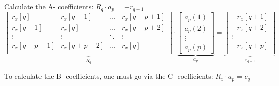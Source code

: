 \begin{aufzaehlung}
			\item Calculate the A- coefficients: $R_q \cdot a_p = - r_{q+1}$
			\small$$
\underbrace{\begin{bmatrix}
			r_x[q] & r_x[q-1] & \hdots & r_x[q-p+1] \\
			r_x[q+1] & r_x[q] & \hdots & r_x[q-p+2] \\
			\vdots & \vdots & \ddots & \vdots \\
			r_x[q+p-1] & r_x[q+p-2] & \hdots & r_x[q] \\
		\end{bmatrix}  }_{R_q} \cdot \underbrace{\begin{bmatrix}
			a_p(1) \\
			a_p(2) \\
			\vdots \\
			a_p(p)
		\end{bmatrix}  }_{a_p}= \underbrace{\begin{bmatrix}
				-r_x[q+1]\\
				-r_x[q+2]\\
			\vdots \\
				-r_x[q+p]\\
		\end{bmatrix}}_{r_{q+1}}
			$$ \normalsize
			\item To calculate the B- coefficients, one must go via the C- coefficients: $R_x \cdot a_p = c_q$


\end{aufzaehlung}

